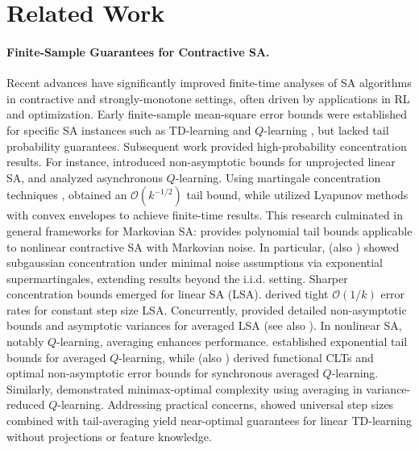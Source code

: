 \documentclass[letterpaper, 10 pt]{article}
\begin{document}
\section{Related Work} \label{sec:related_work}

\paragraph{Finite-Sample Guarantees for Contractive SA.}

Recent advances have significantly improved finite-time analyses of  SA algorithms in contractive and strongly-monotone settings, often driven by applications in RL and optimization. Early finite-sample mean-square error bounds were established for specific SA instances such as TD-learning \cite{Bhandari2018, Dalal2018a, Dalal2018b} and $Q$-learning \cite{EvenDar2003, Beck2012Q}, but lacked tail probability guarantees. Subsequent work provided high-probability concentration results. For instance, \cite{srikant2019finite} introduced non-asymptotic bounds for unprojected linear SA, and \cite{QuWierman2020} analyzed asynchronous $Q$-learning. Using martingale concentration techniques \cite{Freedman1975, Hoeffding1994}, \cite{ThoppeBorkar2019} obtained an $\mathcal{O}(k^{-1/2})$ tail bound, while \cite{chen2020finite} utilized Lyapunov methods with convex envelopes to achieve finite-time results. This research culminated in general frameworks for Markovian SA: \cite{Chen2023Lyap} provides polynomial tail bounds applicable to nonlinear contractive SA with Markovian noise. In particular, \cite{chen2023concentration} (also \cite{Chandak2022, Chandak2023TD0}) showed subgaussian concentration under minimal noise assumptions via exponential supermartingales, extending results beyond the i.i.d. setting. Sharper concentration bounds emerged for linear SA (LSA). \cite{durmus2021tight} derived tight $\mathcal{O}(1/k)$ error rates for constant step size LSA. Concurrently, \cite{mou2020linear} provided detailed non-asymptotic bounds and asymptotic variances for averaged LSA (see also \cite{Lakshmi2020}). In nonlinear SA, notably $Q$-learning, averaging enhances performance. \cite{Wainwright2019} established exponential tail bounds for averaged $Q$-learning, while \cite{Li2021AISTATS} (also \cite{Li2022TIT}) derived functional CLTs and optimal non-asymptotic error bounds for synchronous averaged $Q$-learning. Similarly, \cite{KhamaruWainwright2021} demonstrated minimax-optimal complexity using averaging in variance-reduced $Q$-learning. Addressing practical concerns, \cite{Samsonov2024finite} showed universal step sizes combined with tail-averaging yield near-optimal guarantees for linear TD-learning without projections or feature knowledge. 
\end{document}
